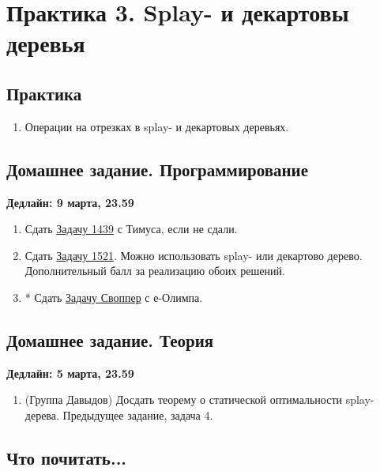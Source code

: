 \section{Практика 3. Splay- и декартовы деревья}

\subsection{Практика}

\begin{enumerate}

  \item Операции на отрезках в splay- и декартовых деревьях.

\end{enumerate}

\subsection{Домашнее задание. Программирование}
\textbf{Дедлайн: 9 марта, 23.59}

\begin{enumerate}

  \item Сдать \href{http://acm.timus.ru/problem.aspx?space=1&num=1439}
{Задачу 1439} с Тимуса, если не сдали.

  \item Сдать \href{http://acm.timus.ru/problem.aspx?space=1&num=1521}
{Задачу 1521}. Можно использовать splay- или декартово дерево. Дополнительный 
  балл за реализацию обоих решений.

  \item* Сдать \href{http://www.e-olimp.com/problems/689}{Задачу Своппер} с 
е-Олимпа.

\end{enumerate}

\subsection{Домашнее задание. Теория}
\textbf{Дедлайн: 5 марта, 23.59}

\begin{enumerate}

  \item (Группа Давыдов) Досдать теорему о статической оптимальности splay-дерева.
  Предыдущее задание, задача 4.

\end{enumerate}

\subsection{Что почитать...}

